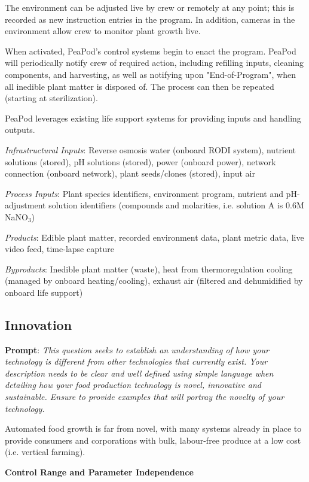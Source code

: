 \documentclass{report}
\begin{document}
The environment can be adjusted live by crew or remotely at any point; this is recorded as new instruction entries in the program. In addition, cameras in the environment allow crew to monitor plant growth live.

When activated, PeaPod's control systems begin to enact the program. PeaPod will periodically notify crew of required action, including refilling inputs, cleaning components, and harvesting, as well as notifying upon "End-of-Program", when all inedible plant matter is disposed of. The process can then be repeated (starting at sterilization).

PeaPod leverages existing life support systems for providing inputs and handling outputs.

\textit{Infrastructural Inputs}: Reverse osmosis water (onboard RODI system), nutrient solutions (stored), pH solutions (stored), power (onboard power), network connection (onboard network), plant seeds/clones (stored), input air

\textit{Process Inputs}: Plant species identifiers, environment program, nutrient and pH-adjustment solution identifiers (compounds and molarities, i.e. solution A is 0.6M NaNO${}_3$)

\textit{Products}: Edible plant matter, recorded environment data, plant metric data, live video feed, time-lapse capture

\textit{Byproducts}: Inedible plant matter (waste), heat from thermoregulation cooling (managed by onboard heating/cooling), exhaust air (filtered and dehumidified by onboard life support)

\subsection{Innovation}
\label{sec:innovation}

\textbf{Prompt}: \textit{This question seeks to establish an understanding of how your technology is different from other technologies that currently exist. Your description needs to be clear and well defined using simple language when detailing how your food production technology is novel, innovative and sustainable. Ensure to provide examples that will portray the novelty of your technology.}

Automated food growth is far from novel, with many systems already in place to provide consumers and corporations with bulk, labour-free produce at a low cost (i.e. vertical farming). 

\textbf{Control Range and Parameter Independence}
\end{document}
